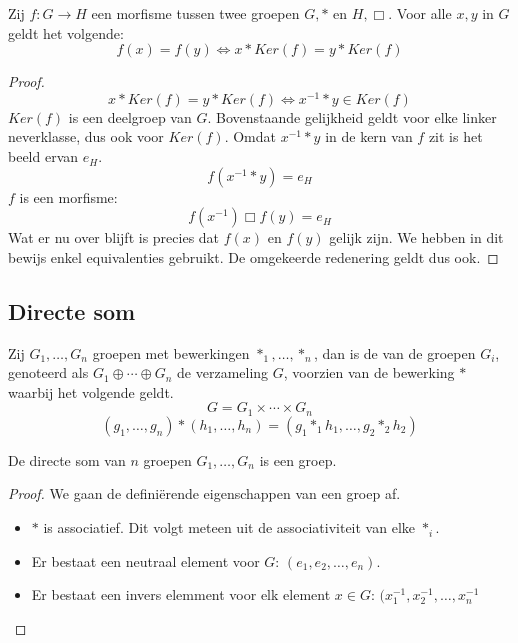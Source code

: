 \documentclass[main.tex]{subfiles}
\begin{document}
\begin{st}
  Zij $f: G \rightarrow H$ een morfisme tussen twee groepen $G,*$ en $H,\Box$. Voor alle $x,y$ in $G$ geldt het volgende:
  \[ f(x) = f(y) \Leftrightarrow x * Ker(f) = y * Ker(f) \]

  \begin{proof}
    \[ x * Ker(f) = y * Ker(f) \Leftrightarrow x^{-1} * y \in Ker(f) \]
    $Ker(f)$ is een deelgroep van $G$.
    Bovenstaande gelijkheid geldt voor elke linker neverklasse, dus ook voor $Ker(f)$.
    Omdat $x^{-1} * y$ in de kern van $f$ zit is het beeld ervan $e_{H}$.
    \[ f(x^{-1} * y) = e_{H} \]
    $f$ is een morfisme:
    \[ f(x^{-1}) \Box f(y) = e_{H}\]
    Wat er nu over blijft is precies dat $f(x)$ en $f(y)$ gelijk zijn.
    We hebben in dit bewijs enkel equivalenties gebruikt. De omgekeerde redenering geldt dus ook.
  \end{proof}
\end{st}

\subsection{Directe som}
\label{sec:directe-som}

\begin{de}
  Zij $G_{1},\dotsc,G_{n}$ groepen met bewerkingen $*_{1},\dotsc,*_{n}$, dan is de  van de groepen $G_{i}$, genoteerd als $G_{1} \oplus \dotsb \oplus G_{n}$ de verzameling $G$, voorzien van de bewerking $*$ waarbij het volgende geldt.
  \[
  G = G_{1} \times \dotsb \times G_{n}
  \]
  \[
  (g_{1},\dotsc,g_{n}) *(h_{1},\dotsc,h_{n}) = (g_{1} *_{1} h_{1}, \dotsc, g_{2} *_{2} h_{2})
  \]
\end{de}

\begin{st}
  De directe som van $n$ groepen $G_{1},\dotsc,G_{n}$ is een groep.

  \begin{proof}
    We gaan de defini\"erende eigenschappen van een groep af.
    \begin{itemize}
    \item $*$ is associatief.
      Dit volgt meteen uit de associativiteit van elke $*_{i}$.
    \item Er bestaat een neutraal element voor $G$: $(e_{1},e_{2},\dotsc,e_{n})$.
    \item Er bestaat een invers elemment voor elk element $x\in G$: $(x_{1}^{-1},x_{2}^{-1},\dotsc,x_{n}^{-1}$
    \end{itemize}
  \end{proof}
\end{st}
\end{document}
